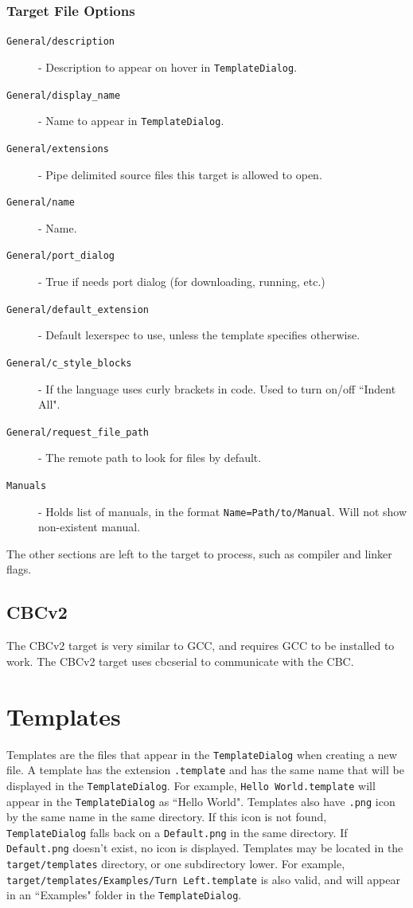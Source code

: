 \documentclass[7pt,letterpaper]{article}
\newcommand{\code}[1]{\texttt{#1}}
\begin{document}
	\subsubsection{Target File Options}
	\begin{description}
	\item[\code{General/description}] - Description to appear on hover in \code{TemplateDialog}.
	\item[\code{General/display\_name}] - Name to appear in \code{TemplateDialog}.
	\item[\code{General/extensions}] - Pipe delimited source files this target is allowed to open.
	\item[\code{General/name}] - Name.
	\item[\code{General/port\_dialog}] - True if needs port dialog (for downloading, running, etc.)
	\item[\code{General/default\_extension}] - Default lexerspec to use, unless the template specifies otherwise.
	\item[\code{General/c\_style\_blocks}] - If the language uses curly brackets in code. Used to turn on/off ``Indent All".
	\item[\code{General/request\_file\_path}] - The remote path to look for files by default.
	\item[\code{Manuals}] - Holds list of manuals, in the format \code{Name=Path/to/Manual}. Will not show non-existent manual.
	\end{description}
	\singlespacing
	The other sections are left to the target to process, such as compiler and linker flags.
	
	\subsection{CBCv2}
	The CBCv2 target is very similar to GCC, and requires GCC to be installed to work.
	The CBCv2 target uses cbcserial to communicate with the CBC.
	
	\section{Templates}
	Templates are the files that appear in the \code{TemplateDialog} when creating a new file. A template has the extension \code{.template}
	and has the same name that will be displayed in the \code{TemplateDialog}. For example, \code{Hello World.template} will appear in the 
	\code{TemplateDialog} as ``Hello World". Templates also have \code{.png} icon by the same name in the same directory. If this icon is not
	found, \code{TemplateDialog} falls back on a \code{Default.png} in the same directory. If \code{Default.png} doesn't exist, no icon is 
	displayed. Templates may be located in the \code{target/templates} directory, or one subdirectory lower. For example, 
	\code{target/templates/Examples/Turn Left.template} is also valid, and will appear in an ``Examples" folder in the \code{TemplateDialog}.
	
\end{document}
